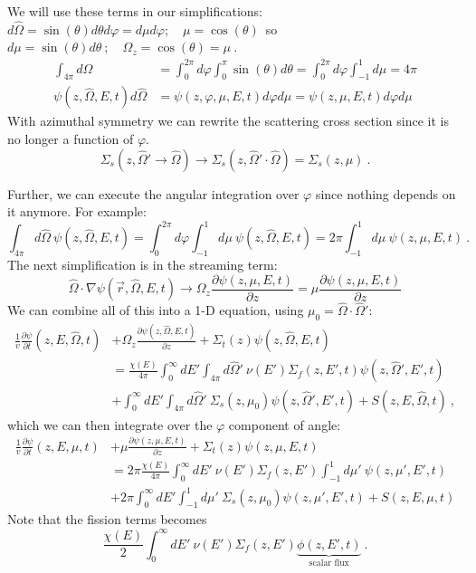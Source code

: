\documentclass[12pt]{article}
\newcommand{\omvec}{\ensuremath{\hat{\Omega}}}
\newcommand{\vOmega}{\ensuremath{\hat{\Omega}}}
\begin{document}
We will use these terms in our simplifications:\\
$d\vOmega = \sin(\theta) d\theta d\varphi = d\mu d\varphi; \quad \mu = \cos(\theta)\,$ so $d\mu = \sin(\theta)d\theta\:; \quad \Omega_z = \cos(\theta) = \mu\:.$
\begin{align*}
\int_{4 \pi} d\vOmega &= \int_0^{2\pi} d\varphi \int_{0}^{\pi} \sin(\theta) d\theta =  \int_0^{2\pi} d\varphi \int_{-1}^1 d\mu = 4\pi \\
\psi(z,\vOmega,E,t) d\vOmega &= \psi(z,\varphi, \mu,E,t) d\varphi  d\mu =  \psi(z, \mu,E,t) d\varphi  d\mu 
\end{align*}
%
With azimuthal symmetry we can rewrite the scattering cross section since it is no longer a function of $\varphi$.
\[\Sigma_s(z, \vOmega' \rightarrow \vOmega) \rightarrow \Sigma_s(z, \vOmega' \cdot \vOmega) = \Sigma_s(z, \mu) \:.\]

Further, we can execute the angular integration over $\varphi$ since nothing depends on it anymore. For example:
\[
\int_{4 \pi} d\vOmega\: \psi(z, \vOmega, E, t) =   \int_0^{2\pi} d\varphi \int_{-1}^1 d\mu \:\psi(z, \vOmega, E, t) = 2 \pi \int_{-1}^1 d\mu \:\psi(z, \mu, E, t)\:.\]
%
The next simplification is in the streaming term:
\[\vOmega \cdot \nabla \psi(\vec{r}, \vOmega, E, t) \rightarrow \Omega_z \frac{\partial \psi(z, \mu, E, t)}{\partial z} = \mu \frac{\partial \psi(z, \mu, E, t)}{\partial z} \]
%
We can combine all of this into a 1-D equation, using $\mu_0 = \vOmega \cdot \vOmega'$:
\begin{align*}
\frac{1}{v}\frac{\partial \psi}{\partial t}(z,E,\omvec,t) &+ \Omega_z \frac{\partial \psi(z, \vOmega, E, t)}{\partial z} + \Sigma_t(z)\psi(z, \vOmega, E, t)  \\
&= \frac{\chi(E)}{4 \pi} \int_0^{\infty} dE'\int_{4 \pi} d\vOmega'\:  \nu(E')\Sigma_f(z,E',t)\psi(z, \vOmega', E', t)  \\
&+ \int_0^{\infty} dE' \int_{4 \pi} d\vOmega'\: \Sigma_s(z, \mu_0)\psi(z, \vOmega', E', t) + S(z, E, \vOmega, t)\:,
\end{align*}
%
which we can then integrate over the $\varphi$ component of angle:
\begin{align*}
\frac{1}{v}\frac{\partial \psi}{\partial t}(z,E,\mu,t) &+ \mu \frac{\partial \psi(z, \mu, E, t)}{\partial z} + \Sigma_t(z)\psi(z, \mu, E, t) \\
&= 2\pi\frac{\chi(E)}{4 \pi} \int_0^{\infty} dE' \: \nu(E')\Sigma_f(z,E') \int_{-1}^1 d\mu'\: \psi(z, \mu', E', t) \\
&+ 2\pi\int_0^{\infty} dE' \int_{-1}^1 d\mu'\: \Sigma_s(z, \mu_0)\psi(z, \mu', E', t)  + S(z, E, \mu, t)
\end{align*}
%
Note that the fission terms becomes
\[\frac{\chi(E)}{2} \int_0^{\infty} dE'\:  \nu(E')\Sigma_f(z,E')\underbrace{\phi(z, E', t)}_{\text{scalar flux}}\:. \]
\end{document}
